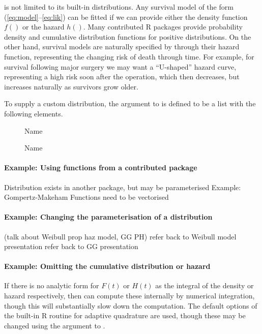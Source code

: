 \documentclass[nojss,nofooter]{jss}
\begin{document}
 is not limited to its built-in distributions.  Any
survival model of the form (\ref{eq:model}--\ref{eq:lik}) can be
fitted if we can provide either the density function $f()$ or the hazard $h()$.
Many contributed R packages provide probability density and cumulative
distribution functions for positive distributions.  On the other hand,
survival models are naturally specified by through their hazard
function, representing the changing risk of death through time.  For
example, for survival following major surgery we may want a
``U-shaped'' hazard curve, representing a high risk soon after the
operation, which then decreases, but increases naturally as survivors
grow older.

To supply a custom distribution, the  argument to
 is defined to be a list with the following elements.

\begin{description}
\item[] Name
\item[] Name
\end{description}
    
\paragraph{Example: Using functions from a contributed package}

Distribution exists in another package, but may be parameterised 
Example: Gompertz-Makeham
Functions need to be vectorised 

\paragraph{Example: Changing the parameterisation of a distribution}

(talk about Weibull prop haz model, GG PH)
refer back to Weibull model presentation
refer back to GG presentation 

\paragraph{Example: Omitting the cumulative distribution or hazard}

If there is no analytic form for $F(t)$ or $H(t)$ as the integral of
the density or hazard respectively, then  can compute
these internally by numerical integration, though this will
substantially slow down the computation.  The default options of the
built-in R routine  for adaptive quadrature are used,
though these may be changed using the  argument to
.
\end{document}
